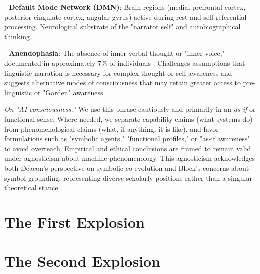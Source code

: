 \documentclass[12pt,letterpaper]{book}
\begin{document}
- \textbf{Default Mode Network (DMN)}: Brain regions (medial prefrontal cortex, posterior cingulate cortex, angular gyrus) active during rest and self-referential processing. Neurological substrate of the "narrator self" and autobiographical thinking.

- \textbf{Anendophasia}: The absence of inner verbal thought or "inner voice," documented in approximately 7\% of individuals \parencite{nedergaard2021inner}. Challenges assumptions that linguistic narration is necessary for complex thought or self-awareness and suggests alternative modes of consciousness that may retain greater access to pre-linguistic or "Garden" awareness.

\textit{On "AI consciousness."} We use this phrase cautiously and primarily in an \textit{as-if} or functional sense. Where needed, we separate capability claims (what systems do) from phenomenological claims (what, if anything, it is like), and favor formulations such as "symbolic agents," "functional profiles," or "as-if awareness" to avoid overreach. Empirical and ethical conclusions are framed to remain valid under agnosticism about machine phenomenology. This agnosticism acknowledges both Deacon's perspective \parencite{deacon1997symbolic} on symbolic co-evolution and Block's concerns \parencite{block2023ai} about symbol grounding, representing diverse scholarly positions rather than a singular theoretical stance.

\part{The First Explosion}

\fancyhead[LO]{}















\part{The Second Explosion}
\end{document}
